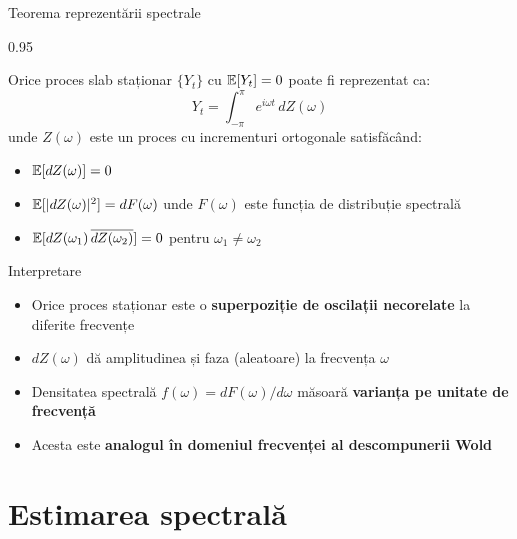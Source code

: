 \documentclass[9pt, aspectratio=169, t]{beamer}
\begin{document}
\begin{frame}{Teorema reprezentării spectrale}
    \begin{cminipage}{0.95\textwidth}
    \vspace{-2mm}
    \begin{thm}
        {\small Orice proces slab staționar $\{Y_t\}$ cu $\mathbb{E}[Y_t] = 0$ poate fi reprezentat ca:
        \[
            Y_t = \int_{-\pi}^{\pi} e^{i\omega t}\,dZ(\omega)
        \]
        unde $Z(\omega)$ este un proces cu incrementuri ortogonale satisfăcând:
        \begin{itemize}\setlength{\itemsep}{0pt}
            \item $\mathbb{E}[dZ(\omega)] = 0$
            \item $\mathbb{E}[|dZ(\omega)|^2] = dF(\omega)$ unde $F(\omega)$ este funcția de distribuție spectrală
            \item $\mathbb{E}[dZ(\omega_1)\,\overline{dZ(\omega_2)}] = 0$ pentru $\omega_1 \neq \omega_2$
        \end{itemize}
        }
    \end{thm}
    \vspace{-2mm}
    \begin{exampleblock}{Interpretare}
        \begin{itemize}\setlength{\itemsep}{0pt}
            \item Orice proces staționar este o \textbf{superpoziție de oscilații necorelate} la diferite frecvențe
            \item $dZ(\omega)$ dă amplitudinea și faza (aleatoare) la frecvența $\omega$
            \item Densitatea spectrală $f(\omega) = dF(\omega)/d\omega$ măsoară \textbf{varianța pe unitate de frecvență}
            \item Acesta este \textbf{analogul în domeniul frecvenței al descompunerii Wold}
        \end{itemize}
    \end{exampleblock}
    \end{cminipage}
\end{frame}

\section{Estimarea spectrală}
\end{document}
